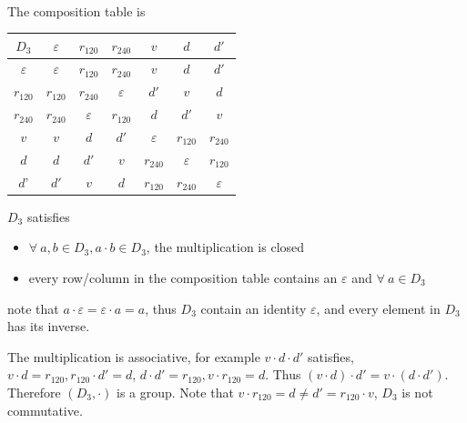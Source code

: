 \documentclass[11pt]{homework}
\newcommand{\fal}{\forall\ }
\begin{document}
\begin{alphaparts}
\begin{align*}
    \end{align*}
    The composition table is
    \begin{center}
        \begin{tabular}{c|cccccc}
            \toprule
            $D_3$         & $\varepsilon$ & $r_{120}$     & $r_{240}$     & $v $          & $d $          & $d'$          \\
            \midrule
            $\varepsilon$ & $\varepsilon$ & $r_{120}$     & $r_{240}$     & $v $          & $d $          & $d'$          \\
            $r_{120}$     & $r_{120}$     & $r_{240}$     & $\varepsilon$ & $d'$          & $v$           & $d $          \\
            $r_{240}$     & $r_{240}$     & $\varepsilon$ & $r_{120}$     & $d $          & $d'$          & $v $          \\
            $v$           & $v$           & $d$           & $d'$          & $\varepsilon$ & $r_{120}$     & $r_{240}$     \\
            $d$           & $d$           & $d'$          & $v$           & $r_{240}$     & $\varepsilon$ & $r_{120}$     \\
            $d$'          & $d'$          & $v$           & $d$           & $r_{120}$     & $r_{240}$     & $\varepsilon$ \\
            \bottomrule
        \end{tabular}
    \end{center}

    \questionpart $D_3$ satisfies
    \begin{itemize}
        \item $\fal a,b\in D_3,a\cdot b\in D_3$, the multiplication is closed
        \item every row/column in the composition table contains an $\varepsilon$ and $\fal a\in D_3$
    \end{itemize}
    note that $a\cdot\varepsilon=\varepsilon\cdot a=a$, thus $D_3$ contain an identity $\varepsilon$, and every element in $D_3$ has its inverse.

    \questionpart The multiplication is associative, for example $v\cdot d\cdot d'$ satisfies, $v\cdot d=r_{120}, r_{120}\cdot d'=d$, $d\cdot d'=r_{120},v\cdot r_{120}=d$. Thus $(v\cdot d)\cdot d'=v\cdot (d\cdot d')$. Therefore $(D_3,\cdot)$ is a group. Note that $ v\cdot r_{120}=d\neq d'=r_120\cdot v$, $D_3$ is not commutative.


\end{alphaparts}
\end{document}
